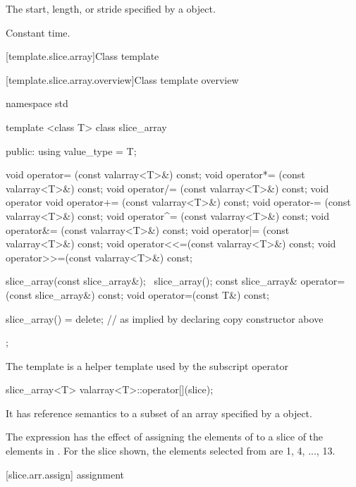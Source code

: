 \begin{itemdescr}
\pnum
\returns The start, length, or stride specified
by a  object.

\pnum
\complexity Constant time.
\end{itemdescr}

[template.slice.array]{Class template }

[template.slice.array.overview]{Class template  overview}

%
\begin{codeblock}
namespace std {
  template <class T> class slice_array {
  public:
    using value_type = T;

    void operator=  (const valarray<T>&) const;
    void operator*= (const valarray<T>&) const;
    void operator/= (const valarray<T>&) const;
    void operator%
    void operator+= (const valarray<T>&) const;
    void operator-= (const valarray<T>&) const;
    void operator^= (const valarray<T>&) const;
    void operator&= (const valarray<T>&) const;
    void operator|= (const valarray<T>&) const;
    void operator<<=(const valarray<T>&) const;
    void operator>>=(const valarray<T>&) const;

    slice_array(const slice_array&);
    ~slice_array();
    const slice_array& operator=(const slice_array&) const;
  void operator=(const T&) const;

    slice_array() = delete;       // as implied by declaring copy constructor above
  };
}
\end{codeblock}

\pnum
The
template is a helper template used by the
subscript operator

\begin{codeblock}
slice_array<T> valarray<T>::operator[](slice);
\end{codeblock}

It has reference semantics to a subset of an array specified by a
object.

\pnum
\begin{example}
The expression
has the effect of assigning the elements of
to a slice of the elements in
.
For the slice shown, the elements
selected from
are 1, 4, ..., 13.
\end{example}

[slice.arr.assign]{ assignment}

